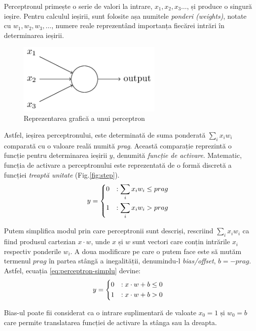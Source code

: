 Perceptronul primește o serie de valori la intrare, $x_1, x_2, x_3\dots$, și produce o singură ieșire. Pentru calculul ieșirii, sunt folosite așa numitele \textit{ponderi (weights)}, notate cu $w_1, w_2, w_3,\dots$, numere reale reprezentând importanța fiecărei intrări în determinarea ieșirii.
\begin{figure}[ht]
\center
\includegraphics[width=7cm, keepaspectratio]{fig/cap2/perceptron.png}
\caption{Reprezentarea grafică a unui perceptron \cite{neuralnetbook:2015}}
\end{figure}
Astfel, ieșirea perceptronului, este determinată de suma ponderată $\sum_i x_iw_i$ comparată cu o valoare reală numită \textit{prag}. Această comparație reprezintă o funcție pentru determinarea ieșirii $y$, denumită \textit{funcție de activare}. Matematic, funcția de activare a perceptronului este reprezentată de o formă discretă a funcției \textit{treaptă unitate} (Fig.\autoref{fig:step}).
\begin{equation}\label{eq:perceptron-simplu}
y = 
	\begin{dcases}
	0 & : \sum_i x_iw_i \le prag\\
	1 & : \sum_i x_iw_i > prag
	\end{dcases}
\end{equation}

Putem simplifica modul prin care perceptronii sunt descriși, rescriind $\sum\nolimits_i x_iw_i$ ca fiind produsul cartezian $x \cdot w$, unde $x$ și $w$ sunt vectori care conțin intrările $x_i$ respectiv ponderile $w_i$. A doua modificare pe care o putem face este să mutăm termenul $prag$ în partea stângă a inegalității, denumindu-l \textit{bias/offset}, $b=-prag$. Astfel, ecuația \ref{eq:perceptron-simplu} devine:
\begin{equation}\label{eq:perceptron}
y = 
	\begin{dcases}
	0 & : x \cdot w + b \le 0\\
	1 & : x \cdot w + b > 0
	\end{dcases}
\end{equation}

Bias-ul poate fii considerat ca o intrare suplimentară de valoate $x_0 = 1 \text{ și } w_0 = b$ care permite translatarea funcției de activare la stânga sau la dreapta.

